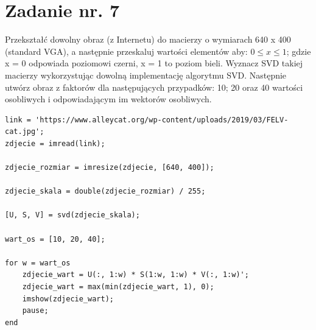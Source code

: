 \documentclass{article}
\begin{document}
\section{Zadanie nr. 7}
Przekształć dowolny obraz (z Internetu) do macierzy o wymiarach 640 x 400 (standard
VGA), a następnie przeskaluj wartości elementów aby: $0\leq x\leq 1$; gdzie x = 0 odpowiada
poziomowi czerni, x = 1 to poziom bieli. Wyznacz SVD takiej macierzy wykorzystując dowolną
implementację algorytmu SVD. Następnie utwórz obraz z faktorów dla następujących przypadków: 10; 20 oraz 40 wartości osobliwych i odpowiadającym im wektorów osobliwych.
\begin{lstlisting}
link = 'https://www.alleycat.org/wp-content/uploads/2019/03/FELV-cat.jpg';
zdjecie = imread(link);

zdjecie_rozmiar = imresize(zdjecie, [640, 400]);

zdjecie_skala = double(zdjecie_rozmiar) / 255;

[U, S, V] = svd(zdjecie_skala);

wart_os = [10, 20, 40];

for w = wart_os
    zdjecie_wart = U(:, 1:w) * S(1:w, 1:w) * V(:, 1:w)';
    zdjecie_wart = max(min(zdjecie_wart, 1), 0);
    imshow(zdjecie_wart);
    pause;
end

\end{lstlisting}  
        
\end{document}
